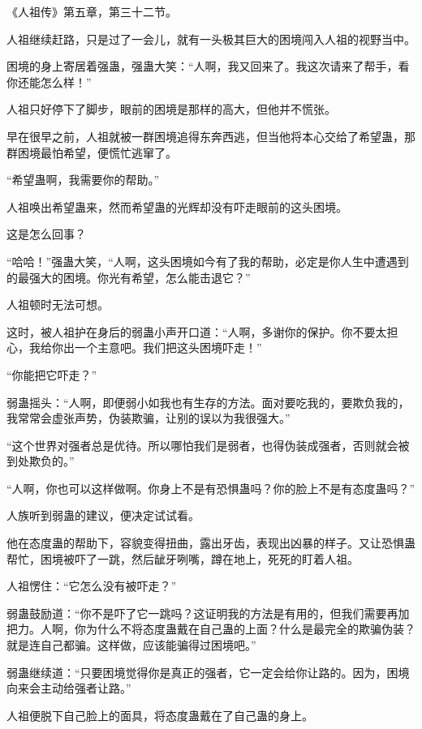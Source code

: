 
\begin{this_body}

《人祖传》第五章，第三十二节。

人祖继续赶路，只是过了一会儿，就有一头极其巨大的困境闯入人祖的视野当中。

困境的身上寄居着强蛊，强蛊大笑：“人啊，我又回来了。我这次请来了帮手，看你还能怎么样！”

人祖只好停下了脚步，眼前的困境是那样的高大，但他并不慌张。

早在很早之前，人祖就被一群困境追得东奔西逃，但当他将本心交给了希望蛊，那群困境最怕希望，便慌忙逃窜了。

“希望蛊啊，我需要你的帮助。”

人祖唤出希望蛊来，然而希望蛊的光辉却没有吓走眼前的这头困境。

这是怎么回事？

“哈哈！”强蛊大笑，“人啊，这头困境如今有了我的帮助，必定是你人生中遭遇到的最强大的困境。你光有希望，怎么能击退它？”

人祖顿时无法可想。

这时，被人祖护在身后的弱蛊小声开口道：“人啊，多谢你的保护。你不要太担心，我给你出一个主意吧。我们把这头困境吓走！”

“你能把它吓走？”

弱蛊摇头：“人啊，即便弱小如我也有生存的方法。面对要吃我的，要欺负我的，我常常会虚张声势，伪装欺骗，让别的误以为我很强大。”

“这个世界对强者总是优待。所以哪怕我们是弱者，也得伪装成强者，否则就会被到处欺负的。”

“人啊，你也可以这样做啊。你身上不是有恐惧蛊吗？你的脸上不是有态度蛊吗？”

人族听到弱蛊的建议，便决定试试看。

他在态度蛊的帮助下，容貌变得扭曲，露出牙齿，表现出凶暴的样子。又让恐惧蛊帮忙，困境被吓了一跳，然后龇牙咧嘴，蹲在地上，死死的盯着人祖。

人祖愣住：“它怎么没有被吓走？”

弱蛊鼓励道：“你不是吓了它一跳吗？这证明我的方法是有用的，但我们需要再加把力。人啊，你为什么不将态度蛊戴在自己蛊的上面？什么是最完全的欺骗伪装？就是连自己都骗。这样做，应该能骗得过困境吧。”

弱蛊继续道：“只要困境觉得你是真正的强者，它一定会给你让路的。因为，困境向来会主动给强者让路。”

人祖便脱下自己脸上的面具，将态度蛊戴在了自己蛊的身上。


\end{this_body}
